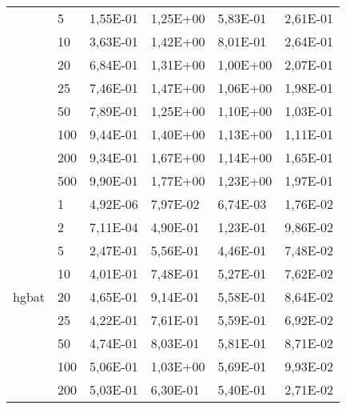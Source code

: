 \begin{longtable}[c]{|p{3.5cm}|l|l|l|l|l|}
                                        & 5         & 1,55E-01   & 1,25E+00   & 5,83E-01   & 2,61E-01  \\ \cline{2-6} 
                                        & 10        & 3,63E-01   & 1,42E+00   & 8,01E-01   & 2,64E-01  \\ \cline{2-6} 
                                        & 20        & 6,84E-01   & 1,31E+00   & 1,00E+00   & 2,07E-01  \\ \cline{2-6} 
                                        & 25        & 7,46E-01   & 1,47E+00   & 1,06E+00   & 1,98E-01  \\ \cline{2-6} 
                                        & 50        & 7,89E-01   & 1,25E+00   & 1,10E+00   & 1,03E-01  \\ \cline{2-6} 
                                        & 100       & 9,44E-01   & 1,40E+00   & 1,13E+00   & 1,11E-01  \\ \cline{2-6} 
                                        & 200       & 9,34E-01   & 1,67E+00   & 1,14E+00   & 1,65E-01  \\ \cline{2-6} 
                                        & 500       & 9,90E-01   & 1,77E+00   & 1,23E+00   & 1,97E-01  \\ \hline
\multirow[t]{10}{*}{hgbat}                 & 1         & 4,92E-06   & 7,97E-02   & 6,74E-03   & 1,76E-02  \\ \cline{2-6} 
                                        & 2         & 7,11E-04   & 4,90E-01   & 1,23E-01   & 9,86E-02  \\ \cline{2-6} 
                                        & 5         & 2,47E-01   & 5,56E-01   & 4,46E-01   & 7,48E-02  \\ \cline{2-6} 
                                        & 10        & 4,01E-01   & 7,48E-01   & 5,27E-01   & 7,62E-02  \\ \cline{2-6} 
                                        & 20        & 4,65E-01   & 9,14E-01   & 5,58E-01   & 8,64E-02  \\ \cline{2-6} 
                                        & 25        & 4,22E-01   & 7,61E-01   & 5,59E-01   & 6,92E-02  \\ \cline{2-6} 
                                        & 50        & 4,74E-01   & 8,03E-01   & 5,81E-01   & 8,71E-02  \\ \cline{2-6} 
                                        & 100       & 5,06E-01   & 1,03E+00   & 5,69E-01   & 9,93E-02  \\ \cline{2-6} 
                                        & 200       & 5,03E-01   & 6,30E-01   & 5,40E-01   & 2,71E-02  \\ \cline{2-6} 

\end{longtable}
